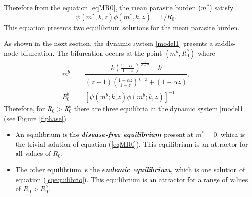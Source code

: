 \documentclass[eng]{MMSB-class-eng}
\begin{document}
{Therefore from the equation \eqref{eqMR0}, the mean parasite burden ($m^*$) satisfy
\begin{equation}\label{eqequilibrio}
\psi(m^*,k,z)\phi(m^*,k,z)=1/R_0.
\end{equation}
This equation presents two  equilibrium solutions for the mean parasite burden. 

As shown in the next section,  the dynamic system \eqref{model1} presents a saddle-node bifurcation.
The bifurcation occurs at the point $(m^b, R_0^b)$ where
\begin{equation}\label{meq}
\begin{split}
m^b=&\dfrac{k\left( \frac{1-\alpha z}{1-z}\right)^{\frac{1}{k+2}} - k}{(z-1)\left( \frac{1-\alpha z}{1-z}\right)^{\frac{1}{k+2}} + (1-\alpha z)},\\ R_0^b=&\left[ \psi(m^b;k,z)\phi(m^b;k,z)\right]^{-1}.
\end{split}	
\end{equation}
Therefore, for $R_0 > R_0^b$ there are three equilibria in the dynamic system \eqref{model1} (see Figure \ref{f:phase}),

\begin{itemize}
	\item An equilibrium is the \textit{\textbf{disease-free equilibrium}} present at $m^*= 0$, which is the trivial solution of equation (\ref{eqMR0}). 
	This equilibrium is an attractor for all values of $R_0$.
	
	\item The other equilibrium
	is the \textit{\textbf{endemic equilibrium}}, which is one solution of equation (\ref{eqequilibrio}).
	This equilibrium is an attractor for a range of values of $R_0> R_0^b $.
	

\end{itemize}}
\end{document}
